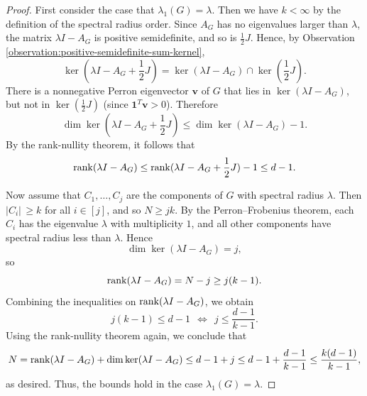 \begin{proof}
    First consider the case that $\lambda_1 (G) = \lambda$. 
    Then we have $k < \infty$ by the definition of the spectral radius order.
    Since $A_G$ has no eigenvalues larger than $\lambda$, the matrix $\lambda I - A_G$ is positive semidefinite, and so is $\frac{1}{2}J$.
    Hence, by Observation \ref{observation:positive-semidefinite-sum-kernel},
    \begin{equation*}
        \ker (\lambda I - A_G + \frac{1}{2}J )  = \ker (\lambda I - A_G) \cap \ker(\frac{1}{2} J ).
    \end{equation*}
    There is a nonnegative Perron eigenvector $\bm{v}$ of $G$ that lies in $\ker (\lambda I - A_G)$, but not in $\ker (\frac{1}{2} J)$ (since $\bm{1}^T \bm{v} > 0$). Therefore 
    \begin{equation*}
        \dim \ker (\lambda I - A_G + \frac{1}{2} J) \le \dim \ker (\lambda I - A_G) - 1.
    \end{equation*}
    By the rank-nullity theorem, it follows that
    \begin{equation*}
        \operatorname{rank} (\lambda I - A_G) \le \operatorname{rank} (\lambda I - A_G + \frac{1}{2} J) - 1 \le d - 1.
    \end{equation*}
    
    Now assume that $C_1, \dots, C_j$ are the components of $G$ with spectral radius $\lambda$. 
    Then $|C_i|\, \ge k$ for all $i \in [j]$, and so $N \ge jk$.
    By the Perron--Frobenius theorem, each $C_i$ has the eigenvalue $\lambda$ with multiplicity $1$, and all other components have spectral radius less than $\lambda$. 
    Hence 
    \begin{equation*}
        \dim \ker (\lambda I - A_G) = j,
    \end{equation*}
    so 
    \begin{equation*}
        \operatorname{rank} (\lambda I - A_G) = N - j \ge j (k - 1).
    \end{equation*}
    Combining the inequalities on $\operatorname{rank} (\lambda I - A_G)$, we obtain 
    \begin{equation*}
        j (k - 1) \le d - 1 \ \ \Longleftrightarrow \ \ j \le \frac{d - 1}{k - 1}.
    \end{equation*}
    Using the rank-nullity theorem again, we conclude that 
    \begin{equation*}
        N = \operatorname{rank} (\lambda I - A_G) + \dim \ker (\lambda I - A_G) \le d - 1 + j \le d - 1 + \frac{d - 1}{k - 1} \le \frac{k (d - 1)}{k - 1},
    \end{equation*}
    as desired. Thus, the bounds hold in the case $\lambda_1(G) = \lambda$.


\end{proof}
